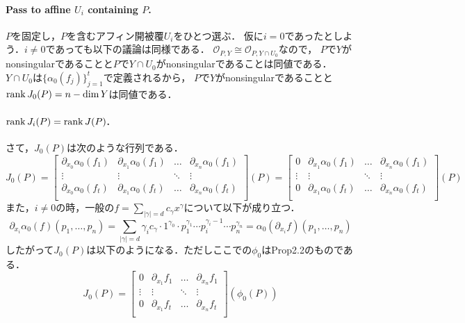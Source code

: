 \documentclass[a4paper]{jsarticle}
\begin{document}
    \paragraph{Pass to affine $U_i$ containing $P$.}
    $P$を固定し，$P$を含むアフィン開被覆$U_i$をひとつ選ぶ．
    仮に$i=0$であったとしよう．$i \neq 0$であっても以下の議論は同様である．
    $\mathcal{O}_{P,Y} \cong \mathcal{O}_{P,Y \cap U_0}$なので，
    $P$で$Y$がnonsingularであることと$P$で$Y \cap U_0$がnonsingularであることは同値である．
    $Y \cap U_0$は$\{\alpha_0(f_j)\}_{j=1}^t$で定義されるから，
    $P$で$Y$がnonsingularであることと$\operatorname{rank} J_0(P)=n-\dim Y$は同値である．

    \paragraph{$\operatorname{rank} J_i(P)=\operatorname{rank} J(P)$.}
    さて，$J_0(P)$は次のような行列である．
    \[
        J_0(P)
        =
        \begin{bmatrix}
            \partial_{x_0} \alpha_0(f_1) & \partial_{x_1} \alpha_0(f_1) & \dots  & \partial_{x_n} \alpha_0(f_1)  \\
                            \vdots       &          \vdots              & \ddots &          \vdots               \\
            \partial_{x_0} \alpha_0(f_t) & \partial_{x_1} \alpha_0(f_t) & \dots  & \partial_{x_n} \alpha_0(f_t)  \\
        \end{bmatrix}
        (P)
        =
        \begin{bmatrix}
            0           & \partial_{x_1} \alpha_0(f_1) & \dots  & \partial_{x_n} \alpha_0(f_1)  \\
            \vdots      &          \vdots              & \ddots &          \vdots               \\
            0           & \partial_{x_1} \alpha_0(f_t) & \dots  & \partial_{x_n} \alpha_0(f_t)  \\
        \end{bmatrix}
        (P)
    \]
    また，$i \neq 0$の時，一般の$f=\sum_{|\gamma|=d}{c_{\gamma} x^{\gamma}}$について以下が成り立つ．
    \[
        \partial_{x_i} \alpha_0(f)(p_1,\dots,p_n)
        =\sum_{|\gamma|=d} \gamma_i c_{\gamma} \cdot 1^{\gamma_0} \cdot p_1^{\gamma_1} \cdots p_i^{\gamma_i-1} \cdots p_n^{\gamma_n}
        =\alpha_0(\partial_{x_i} f)(p_1,\dots,p_n)
    \]
    したがって$J_0(P)$は以下のようになる．ただしここでの$\phi_0$はProp2.2のものである．
    \[
        J_0(P)
        =
        \begin{bmatrix}
            0           & \partial_{x_1} f_1 & \dots  & \partial_{x_n} f_1  \\
            \vdots      &          \vdots              & \ddots &          \vdots               \\
            0           & \partial_{x_1} f_t & \dots  & \partial_{x_n} f_t  \\
        \end{bmatrix}
        (\phi_0(P))
    \]
\end{document}
